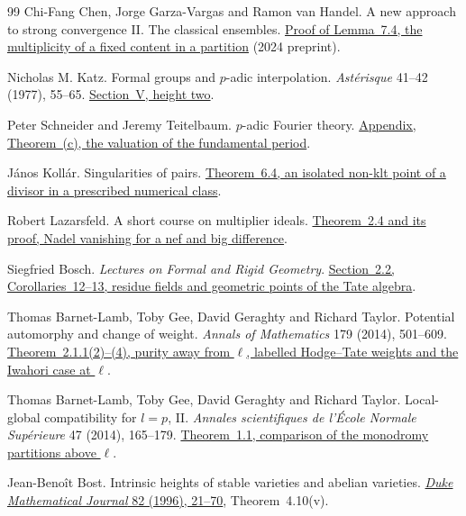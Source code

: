 \begin{thebibliography}{99}
Chi-Fang Chen, Jorge Garza-Vargas and Ramon van Handel.
A new approach to strong convergence II. The classical ensembles.
\href{https://web.math.princeton.edu/~rvan/strongii241216.pdf\#page=29}
{Proof of Lemma~7.4, the multiplicity of a fixed content in a partition}
(2024 preprint).

Nicholas M. Katz.
Formal groups and \(p\)-adic interpolation.
\emph{Ast\'erisque} 41--42 (1977), 55--65.
\href{https://www.numdam.org/article/AST_1977__41-42__55_0.pdf\#page=9}
{Section~V, height two}.

Peter Schneider and Jeremy Teitelbaum.
\(p\)-adic Fourier theory.
\href{https://arxiv.org/pdf/math/0102012\#page=33}
{Appendix, Theorem~(c), the valuation of the fundamental period}.

J\'anos Koll\'ar.
Singularities of pairs.
\href{https://arxiv.org/pdf/alg-geom/9601026v2\#page=35}
{Theorem~6.4, an isolated non-klt point of a divisor in a prescribed numerical class}.

Robert Lazarsfeld.
A short course on multiplier ideals.
\href{https://www.math.stonybrook.edu/~roblaz/Reprints/Lazarsfeld.PCMI.Short.Course.MI.pdf\#page=11}
{Theorem~2.4 and its proof, Nadel vanishing for a nef and big difference}.

Siegfried Bosch.
\emph{Lectures on Formal and Rigid Geometry}.
\href{https://www.math.purdue.edu/~tongliu/seminar/rigid/Bosch.pdf}
{Section~2.2, Corollaries~12--13, residue fields and geometric points of the Tate algebra}.

Thomas Barnet-Lamb, Toby Gee, David Geraghty and Richard Taylor.
Potential automorphy and change of weight.
\emph{Annals of Mathematics} 179 (2014), 501--609.
\href{https://www.ma.imperial.ac.uk/~tsg/Index_files/potentialautomorphy.pdf\#page=33}
{Theorem~2.1.1(2)--(4), purity away from \(\ell\), labelled Hodge--Tate weights and the Iwahori case at \(\ell\)}.

Thomas Barnet-Lamb, Toby Gee, David Geraghty and Richard Taylor.
Local-global compatibility for \(l=p\), II.
\emph{Annales scientifiques de l'\'{E}cole Normale Sup\'erieure} 47 (2014), 165--179.
\href{https://www.ma.imperial.ac.uk/~tsg/Index_files/localglobalII.pdf\#page=6}
{Theorem~1.1, comparison of the monodromy partitions above \(\ell\)}.

Jean-Beno\^it Bost.
Intrinsic heights of stable varieties and abelian varieties.
\href{https://doi.org/10.1215/S0012-7094-96-08202-2}
{\emph{Duke Mathematical Journal} 82 (1996), 21--70},
Theorem~4.10(v).


\end{thebibliography}
